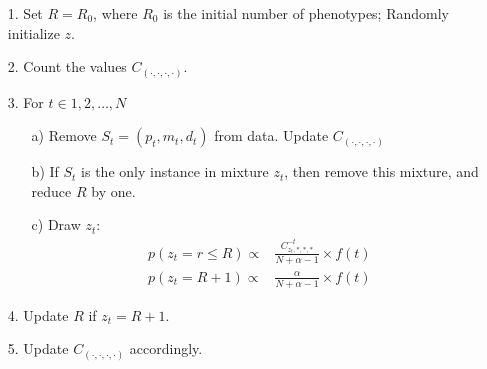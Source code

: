 \documentclass[conference]{IEEEtran}
\begin{document}
	\begin{itemize}
		\item[1.] Set $R = R_0$, where $R_0$ is the initial number of phenotypes; Randomly initialize $z$. 
		\item[2.] Count the values $C_{(\cdot, \cdot, \cdot, \cdot)}$. 
		\item[3.] For $t \in 1, 2, \ldots, N$
			\begin{itemize}
				\item[a)] Remove $S_t = (p_t, m_t, d_t)$ from data. Update $C_{(\cdot, \cdot, \cdot, \cdot)}$
				\item[b)] If $S_t$ is the only instance in mixture $z_t$, then remove this mixture, and reduce $R$ by one. 
				\item[c)] Draw $z_t$: 
				\begin{align*}
					p(z_t = r \leq R) \propto &  \frac{C_{z_t, *, *, *}^{-t}}{N + \alpha - 1} \times f(t) \\
					p(z_t = R + 1) \propto & \frac{\alpha}{N + \alpha - 1} \times f(t)
				\end{align*}
			\end{itemize}
		\item[4.] Update $R$ if $z_t = R + 1$. 
		\item[5.] Update $C_{(\cdot, \cdot, \cdot, \cdot)}$ accordingly. 
	\end{itemize}
 



%
%
\end{document}
